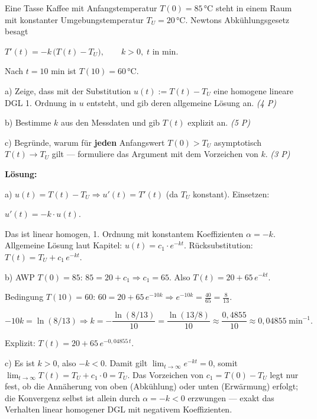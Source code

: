 \documentclass[11pt, a4paper]{article}
\begin{document}
Eine Tasse Kaffee mit Anfangstemperatur $T(0)=85\,°\text{C}$ steht in einem Raum mit konstanter Umgebungstemperatur $T_U=20\,°\text{C}$. Newtons Abkühlungsgesetz besagt

$T'(t) = -k\,\big(T(t)-T_U\big), \qquad k>0,\; t \text{ in min}.$

Nach $t=10$ min ist $T(10)=60\,°\text{C}$.


a) Zeige, dass mit der Substitution $u(t):=T(t)-T_U$ eine homogene lineare DGL 1. Ordnung in $u$ entsteht, und gib deren allgemeine Lösung an. \textit{(4 P)}

b) Bestimme $k$ aus den Messdaten und gib $T(t)$ explizit an. \textit{(5 P)}

c) Begründe, warum für \textbf{jeden} Anfangswert $T(0)>T_U$ asymptotisch $T(t)\to T_U$ gilt — formuliere das Argument mit dem Vorzeichen von $k$. \textit{(3 P)}


\textbf{Lösung:}


a) $u(t)=T(t)-T_U \Rightarrow u'(t)=T'(t)$ (da $T_U$ konstant). Einsetzen:

$u'(t) = -k\cdot u(t).$

Das ist linear homogen, 1. Ordnung mit konstantem Koeffizienten $\alpha=-k$. Allgemeine Lösung laut Kapitel: $u(t)=c_1\cdot e^{-kt}.$ Rücksubstitution: $T(t)=T_U + c_1\,e^{-kt}.$


b) AWP $T(0)=85$: $85 = 20 + c_1 \Rightarrow c_1=65.$ Also $T(t)=20+65\,e^{-kt}.$

Bedingung $T(10)=60$: $60=20+65\,e^{-10k} \Rightarrow e^{-10k}=\tfrac{40}{65}=\tfrac{8}{13}.$

$-10k=\ln(8/13) \Rightarrow k=-\dfrac{\ln(8/13)}{10}=\dfrac{\ln(13/8)}{10} \approx \dfrac{0{,}4855}{10}\approx 0{,}04855\;\text{min}^{-1}.$

Explizit: $T(t)=20+65\,e^{-0{,}04855\,t}.$


c) Es ist $k>0$, also $-k<0$. Damit gilt $\lim_{t\to\infty}e^{-kt}=0$, somit $\lim_{t\to\infty}T(t)=T_U+c_1\cdot 0 = T_U.$ Das Vorzeichen von $c_1=T(0)-T_U$ legt nur fest, ob die Annäherung von oben (Abkühlung) oder unten (Erwärmung) erfolgt; die Konvergenz selbst ist allein durch $\alpha=-k<0$ erzwungen — exakt das Verhalten linear homogener DGL mit negativem Koeffizienten.





\end{document}

